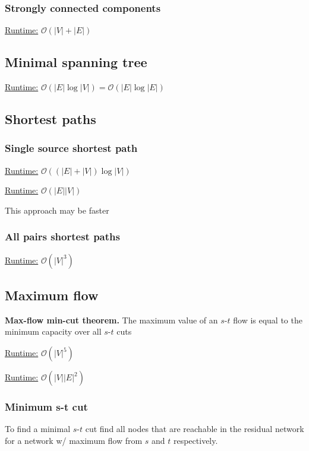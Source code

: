 \subsubsection{Strongly connected components}
\underline{Runtime:} $\mathcal{O}(\lvert V \rvert + \lvert E \rvert)$


\subsection{Minimal spanning tree}
\underline{Runtime:} $\mathcal{O}(\lvert E \rvert \log \lvert V
\rvert) = \mathcal{O}(\lvert E \rvert \log \lvert E \rvert)$

\subsection{Shortest paths}

\subsubsection{Single source shortest path}
\underline{Runtime:}
$\mathcal{O}((\lvert E \rvert + \lvert V \rvert )\log \lvert V
\rvert)$

\underline{Runtime:} $\mathcal{O}(\lvert E \rvert \lvert V \rvert)$

This approach may be faster
\subsubsection{All pairs shortest paths}
\underline{Runtime:} $\mathcal{O}(\lvert V \rvert^3)$

\subsection{Maximum flow}

\textbf{Max-flow min-cut theorem.} The maximum value of an $s$-$t$ flow is
equal to the minimum capacity over all $s$-$t$ cuts

\underline{Runtime:} $\mathcal{O}(\lvert V \rvert^5)$

\underline{Runtime:} $\mathcal{O}(\lvert V \rvert \lvert E \rvert^2)$

\subsubsection{Minimum s-t cut}

To find a minimal $s$-$t$ cut find all nodes that are reachable in the
residual network for a network w/ maximum flow from $s$ and $t$
respectively.


